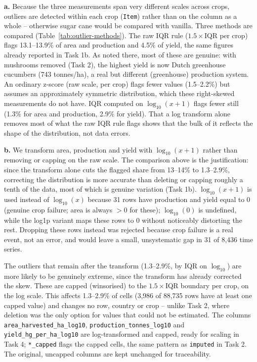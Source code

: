 
\textbf{a.}
Because the three measurements span very different scales across crops, outliers are detected within each crop (\texttt{Item}) rather than on the column as a whole -- otherwise sugar cane would be compared with vanilla. Three methods are compared (Table~\ref{tab:outlier-methods}). The raw IQR rule ($1.5\times$IQR per crop) flags 13.1--13.9\% of area and production and 4.5\% of yield, the same figures already reported in Task 1b. As noted there, most of these are genuine: with mushrooms removed (Task 2), the highest yield is now Dutch greenhouse cucumbers (743 tonnes/ha), a real but different (greenhouse) production system. An ordinary z-score (raw scale, per crop) flags fewer values (1.5--2.2\%) but assumes an approximately symmetric distribution, which these right-skewed measurements do not have. IQR computed on $\log_{10}(x+1)$ flags fewer still (1.3\% for area and production, 2.9\% for yield). That a log transform alone removes most of what the raw IQR rule flags shows that the bulk of it reflects the shape of the distribution, not data errors.

\textbf{b.}
We transform area, production and yield with $\log_{10}(x+1)$ rather than removing or capping on the raw scale. The comparison above is the justification: since the transform alone cuts the flagged share from 13--14\% to 1.3--2.9\%, correcting the distribution is more accurate than deleting or capping roughly a tenth of the data, most of which is genuine variation (Task 1b). $\log_{10}(x+1)$ is used instead of $\log_{10}(x)$ because 31 rows have production and yield equal to 0 (genuine crop failure; area is always $>0$ for these); $\log_{10}(0)$ is undefined, while the log1p variant maps these rows to 0 without noticeably distorting the rest. Dropping these rows instead was rejected because crop failure is a real event, not an error, and would leave a small, unsystematic gap in 31 of 8,436 time series.

The outliers that remain after the transform (1.3--2.9\%, by IQR on $\log_{10}$) are more likely to be genuinely extreme, since the transform has already corrected the skew. These are capped (winsorised) to the $1.5\times$IQR boundary per crop, on the log scale. This affects 1.3--2.9\% of cells (3,986 of 88,735 rows have at least one capped value) and changes no row, country or crop -- unlike Task 2, where deletion was the only option for values that could not be estimated. The columns \texttt{area\_harvested\_ha\_log10}, \texttt{production\_tonnes\_log10} and \texttt{yield\_hg\_per\_ha\_log10} are log-transformed and capped, ready for scaling in Task 4; \texttt{*\_capped} flags the capped cells, the same pattern as \texttt{imputed} in Task 2. The original, uncapped columns are kept unchanged for traceability.

